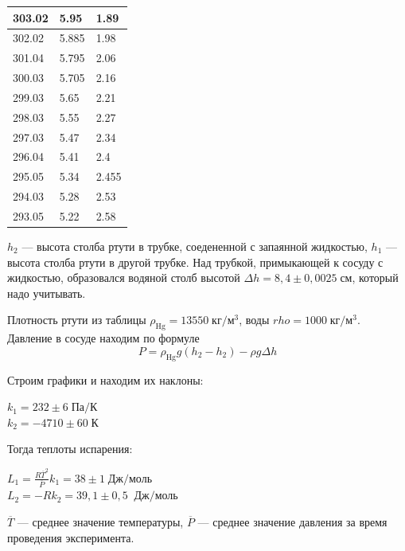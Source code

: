 \begin{table}[!ht]
\begin{tabular}{|l|l|l|}
        303.02 & 5.95 & 1.89 \\ \hline
        302.02 & 5.885 & 1.98 \\ \hline
        301.04 & 5.795 & 2.06 \\ \hline
        300.03 & 5.705 & 2.16 \\ \hline
        299.03 & 5.65 & 2.21 \\ \hline
        298.03 & 5.55 & 2.27 \\ \hline
        297.03 & 5.47 & 2.34 \\ \hline
        296.04 & 5.41 & 2.4 \\ \hline
        295.05 & 5.34 & 2.455 \\ \hline
        294.03 & 5.28 & 2.53 \\ \hline
        293.05 & 5.22 & 2.58 \\ \hline
    \end{tabular}
\end{table}

$h_2$ --- высота столба ртути в трубке, соедененной с запаянной жидкостью, $h_1$ ---
высота столба ртути в другой трубке. Над трубкой, примыкающей к сосуду с жидкостью,
образовался водяной столб высотой $\Delta h = 8{,}4\pm 0{,}0025\;\text{см}$, который надо учитывать.

Плотность ртути из таблицы $\rho_\text{Hg}=13550\;\text{кг}/\text{м}^3$, воды $rho=1000\;\text{кг}/\text{м}^3$.
Давление в сосуде находим по формуле
\[P=\rho_\text{Hg}g(h_2-h_2)-\rho g\Delta h\]

Строим графики и находим их наклоны:
\begin{center}
    $k_1 = 232\pm 6\;\text{Па}/\text{К}$\\
    $k_2 = -4710\pm 60\;\text{К}$
\end{center}

Тогда теплоты испарения:
\begin{center}
    $L_1 = \frac{R\overline{T}^2}{\overline{P}}k_1 = 38\pm 1\;\text{Дж}/\text{моль}$\\
    $L_2 = -Rk_2 = 39{,}1\pm 0{,}5\;\;\text{Дж}/\text{моль}$
\end{center}

$\overline{T}$ --- среднее значение температуры, $\overline{P}$ --- среднее значение давления
за время проведения эксперимента.

